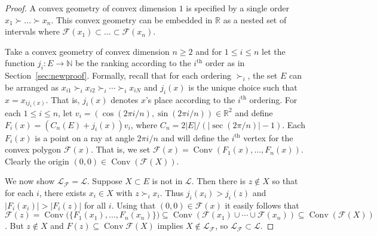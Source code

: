 \documentclass[12pt]{elsarticle}
\theoremstyle{plain}
\theoremstyle{definition}
\newcommand{\F}{\mathcal{F}}
\newcommand{\cgeom}{\mathcal{L}}
\DeclareMathOperator{\Hull}{Conv}
\begin{document}
\begin{proof}
A convex geometry of convex dimension $1$ is specified by a single order $x_1 \succ \ldots \succ x_n$. This convex geometry can be embedded in $\mathbb{R}$ as a nested set of intervals where $\F(x_1) \subset \ldots \subset \F(x_n)$.

Take a convex geometry of convex dimension $n\geq 2$ and for $1\leq i\leq n$ let the function \mbox{$j_{i}:E\to\mathbb{N}$} be the ranking according to the $i^{\text{th}}$ order as in Section~\ref{sec:newproof}. Formally, recall that for each ordering $\succ_i$, the set $E$  can be arranged as $x_{i1}\succ_{i}x_{i2}\succ_{i}\dotsm\succ_{i}x_{iN}$ and $j_{i}(x)$ is the unique choice such that $x=x_{ij_{i}(x)}$. That is, $j_i(x)$ denotes $x$'s place according to the $i^{\text{th}}$ ordering.  For each $1\leq i \leq n$, let \mbox{$v_{i}= (\cos(2\pi i/n),\sin(2\pi i /n)) \in\mathbb{R}^{2}$} and define $F_i(x) =(C_{n}(E)+ j_i(x) )v_{i}$, where \linebreak \mbox{$C_{n}=2|E|/(|\sec(2\pi/n)|-1)$}.  Each $F_i(x)$ is a point on a ray at angle $2 \pi i /n$  and will define the $i^{\text{th}}$ vertex for the convex polygon $\F(x)$. That is, we set $\F(x) = \Hull(F_1(x),\ldots,F_n(x))$.  Clearly the origin $(0,0)\in\Hull(\F(X))$.


We now show  $\cgeom_{\F}=\cgeom$.  Suppose $X\subset E$ is not in $\cgeom$.  Then there is $z \notin X$ so that for each $i$, there exists $x_i \in X$ with $z \succ_i x_i$.  Thus $j_{i}(x_{i})>j_{i}(z)$ and $|F_i(x_i)| > |F_i(z)|$ for all $i$.  Using that $(0,0)\in\F(x)$ it easily follows that $\F(z)= \Hull\bigl(\{F_1(x_1),\dotsc,F_n(x_n)\}\bigr) \subseteq\Hull(\F(x_1)\cup\dotsm\cup\F(x_n)) \subseteq \Hull(\F(X))$.  But $z\notin X$ and $F(z)\subseteq\Hull\F(X)$ implies $X\notin \cgeom_{\F}$, so $\cgeom_{\F}\subset\cgeom$.


\end{proof}
\end{document}
